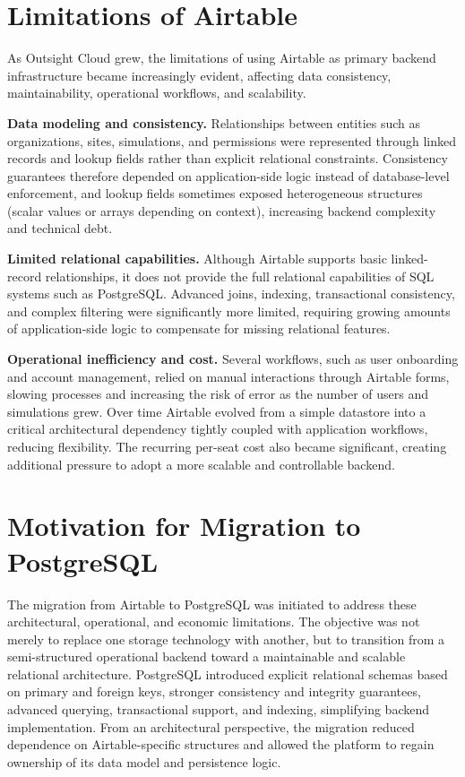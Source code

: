 \section{Limitations of Airtable}
As Outsight Cloud grew, the limitations of using Airtable as primary backend infrastructure became increasingly evident, affecting data consistency, maintainability, operational workflows, and scalability.

\textbf{Data modeling and consistency.} Relationships between entities such as organizations, sites, simulations, and permissions were represented through linked records and lookup fields rather than explicit relational constraints. Consistency guarantees therefore depended on application-side logic instead of database-level enforcement, and lookup fields sometimes exposed heterogeneous structures (scalar values or arrays depending on context), increasing backend complexity and technical debt.

\textbf{Limited relational capabilities.} Although Airtable supports basic linked-record relationships, it does not provide the full relational capabilities of SQL systems such as PostgreSQL. Advanced joins, indexing, transactional consistency, and complex filtering were significantly more limited, requiring growing amounts of application-side logic to compensate for missing relational features.

\textbf{Operational inefficiency and cost.} Several workflows, such as user onboarding and account management, relied on manual interactions through Airtable forms, slowing processes and increasing the risk of error as the number of users and simulations grew. Over time Airtable evolved from a simple datastore into a critical architectural dependency tightly coupled with application workflows, reducing flexibility. The recurring per-seat cost also became significant, creating additional pressure to adopt a more scalable and controllable backend.

\section{Motivation for Migration to PostgreSQL}
The migration from Airtable to PostgreSQL was initiated to address these architectural, operational, and economic limitations. The objective was not merely to replace one storage technology with another, but to transition from a semi-structured operational backend toward a maintainable and scalable relational architecture. PostgreSQL introduced explicit relational schemas based on primary and foreign keys, stronger consistency and integrity guarantees, advanced querying, transactional support, and indexing, simplifying backend implementation. From an architectural perspective, the migration reduced dependence on Airtable-specific structures and allowed the platform to regain ownership of its data model and persistence logic.
